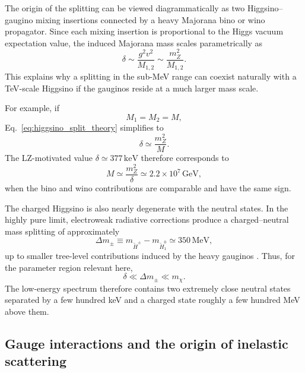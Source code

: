 \documentclass[aps,prd,reprint,superscriptaddress,nofootinbib,longbibliography,floatfix]{revtex4-2}
\newcommand{\GeV}{\mathrm{GeV}}
\newcommand{\keV}{\mathrm{keV}}
\begin{document}
The origin of the splitting can be viewed diagrammatically as two Higgsino--gaugino mixing insertions connected by a heavy Majorana bino or wino propagator. Since each mixing insertion is proportional to the Higgs vacuum expectation value, the induced Majorana mass scales parametrically as
\begin{equation}
\delta
\sim
\frac{g^2v^2}{M_{1,2}}
\sim
\frac{m_Z^2}{M_{1,2}}.
\end{equation}
This explains why a splitting in the sub-MeV range can coexist naturally with a TeV-scale Higgsino if the gauginos reside at a much larger mass scale.

For example, if
\begin{equation}
M_1=M_2=M,
\end{equation}
Eq.~\eqref{eq:higgsino_split_theory} simplifies to
\begin{equation}
\delta\simeq\frac{m_Z^2}{M}.
\label{eq:higgsino_equal_gaugino}
\end{equation}
The LZ-motivated value $\delta\simeq377\,\keV$ therefore corresponds to
\begin{equation}
M\simeq
\frac{m_Z^2}{\delta}
\simeq
2.2\times10^7\,\GeV,
\end{equation}
when the bino and wino contributions are comparable and have the same sign.

The charged Higgsino is also nearly degenerate with the neutral states. In the highly pure limit, electroweak radiative corrections produce a charged--neutral mass splitting of approximately
\begin{equation}
\Delta m_\pm
\equiv
m_{\widetilde H^\pm}
-
m_{\widetilde H_1^0}
\simeq
350\,\mathrm{MeV},
\label{eq:higgsino_charged_split}
\end{equation}
up to smaller tree-level contributions induced by the heavy gauginos \cite{KrallReece2018}. Thus, for the parameter region relevant here,
\begin{equation}
\delta
\ll
\Delta m_\pm
\ll
m_\chi.
\end{equation}
The low-energy spectrum therefore contains two extremely close neutral states separated by a few hundred keV and a charged state roughly a few hundred MeV above them.


\subsection{Gauge interactions and the origin of inelastic scattering}
\end{document}
